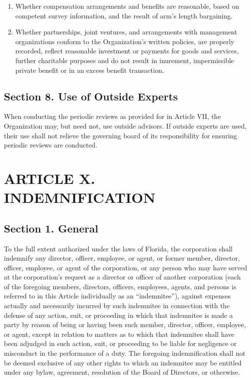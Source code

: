 \documentclass[a4paper]{article}
\begin{document}
\begin{enumerate}
\item Whether compensation arrangements and benefits are reasonable, based on competent survey information, and the result of arm's length bargaining.
\item Whether partnerships, joint ventures, and arrangements with management organizations conform to the Organization's written policies, are properly recorded, reflect reasonable investment or payments for goods and services, further charitable purposes and do not result in inurement, impermissible private benefit or in an excess benefit transaction.
\end{enumerate}

\subsection*{Section 8. Use of Outside Experts}

When conducting the periodic reviews as provided for in Article VII, the Organization may, but need not, use outside advisors. If outside experts are used, their use shall not relieve the governing board of its responsibility for ensuring periodic reviews are conducted.

\section*{ARTICLE X. INDEMNIFICATION}


\subsection*{Section 1. General}

To the full extent authorized under the laws of Florida, the corporation shall indemnify any director, officer, employee, or agent, or former member, director, officer, employee, or agent of the corporation, or any person who may have served at the corporation's request as a director or officer of another corporation (each of the foregoing members, directors, officers, employees, agents, and persons is referred to in this Article individually as an “indemnitee”), against expenses actually and necessarily incurred by such indemnitee in connection with the defense of any action, suit, or proceeding in which that indemnitee is made a party by reason of being or having been such member, director, officer, employee, or agent, except in relation to matters as to which that indemnitee shall have been adjudged in such action, suit, or proceeding to be liable for negligence or misconduct in the performance of a duty. The foregoing indemnification shall not be deemed exclusive of any other rights to which an indemnitee may be entitled under any bylaw, agreement, resolution of the Board of Directors, or otherwise.
\end{document}
